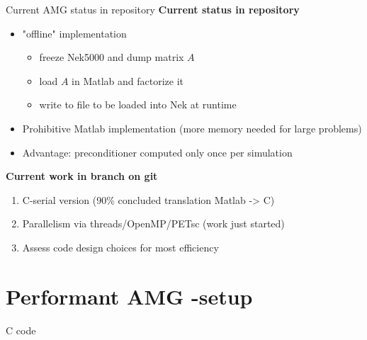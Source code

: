 \documentclass[usenames,dvipsnames,svgnames,9pt]{beamer}
\begin{document}
\begin{frame}{Current AMG status in repository}
\textbf{Current status in repository}
\begin{itemize}
\item "offline" implementation
\begin{itemize}
\item freeze Nek5000 and dump matrix $A$ 
\item load $A$ in Matlab and factorize it
\item write to file to be loaded into Nek at runtime 
\end{itemize}
\item Prohibitive Matlab implementation (more memory needed for large problems)
\item Advantage: preconditioner computed only once per simulation
\end{itemize}

\vspace{5mm}

\textbf{Current work in branch on git}
\begin{enumerate}
\item C-serial version (90\% concluded translation Matlab -> C)
\item Parallelism via threads/OpenMP/PETsc (work just started)
\item Assess code design choices for most efficiency
\end{enumerate}

\end{frame}

\section{Performant AMG -setup}

\begin{frame}{C code}




\end{frame}
\end{document}
